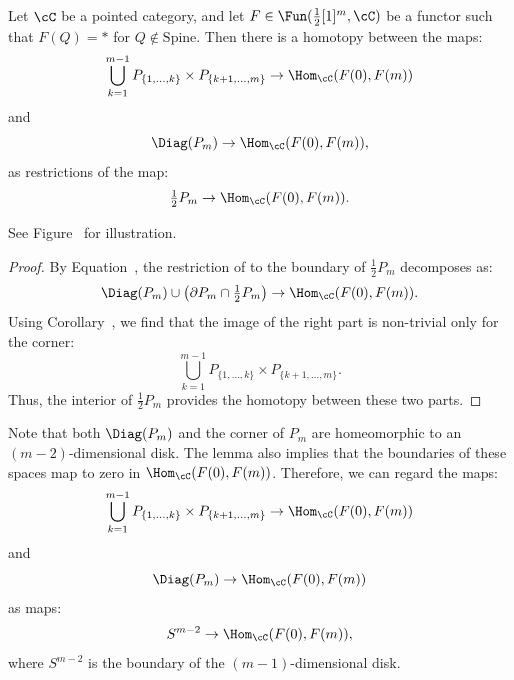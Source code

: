 \begin{lem}\label{lem:comp_is_boundary}
Let $\cC$ be a pointed category, and let $F \in \Fun(\tfrac{1}{2}[1]^m, \cC)$ be a functor such that $F(Q) = *$ for $Q \notin \text{Spine}$. Then there is a homotopy between the maps:
\begin{equation*}
    \bigcup_{k = 1}^{m - 1} P_{\{1, \dots, k\}} \times P_{\{k + 1, \dots, m\}} \to \Hom_{\cC}(F(0), F(m))
\end{equation*}
and
\begin{equation*}
    \Diag(P_m) \to \Hom_{\cC}(F(0), F(m)),
\end{equation*}
as restrictions of the map:
\begin{equation}\label{eq1}
    \tfrac{1}{2}P_m \to \Hom_{\cC}(F(0), F(m)).
\end{equation}
\end{lem}

See Figure~ for illustration.

\begin{proof}
By Equation~, the restriction of  to the boundary of $\tfrac{1}{2}P_m$ decomposes as:
\begin{equation*}
    \Diag(P_m) \cup \left( \partial P_m \cap \tfrac{1}{2}P_m \right) \to \Hom_{\cC}(F(0), F(m)).
\end{equation*}
Using Corollary~, we find that the image of the right part is non-trivial only for the corner:
\begin{equation*}
    \bigcup_{k = 1}^{m - 1} P_{\{1, \dots, k\}} \times P_{\{k + 1, \dots, m\}}.
\end{equation*}
Thus, the interior of $\tfrac{1}{2}P_m$ provides the homotopy between these two parts.
\end{proof}

\begin{obs}\label{obs:diag_is_disk}
Note that both $\Diag(P_m)$ and the corner of $P_m$ are homeomorphic to an $(m - 2)$-dimensional disk. The lemma also implies that the boundaries of these spaces map to zero in $\Hom_{\cC}(F(0), F(m))$. Therefore, we can regard the maps:
\begin{equation*}
    \bigcup_{k = 1}^{m - 1} P_{\{1, \dots, k\}} \times P_{\{k + 1, \dots, m\}} \to \Hom_{\cC}(F(0), F(m))
\end{equation*}
and
\begin{equation*}
    \Diag(P_m) \to \Hom_{\cC}(F(0), F(m))
\end{equation*}
as maps:
\begin{equation*}
    S^{m - 2} \to \Hom_{\cC}(F(0), F(m)),
\end{equation*}
where $S^{m - 2}$ is the boundary of the $(m - 1)$-dimensional disk.
\end{obs}

